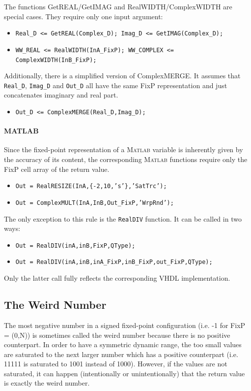 \documentclass[a4paper,11pt]{article}
\begin{document}
The functions GetREAL/GetIMAG and RealWIDTH/ComplexWIDTH are special
cases. They require only one input argument:
\begin{itemize}
\item \texttt{Real\_D <= GetREAL(Complex\_D); Imag\_D <=
    GetIMAG(Complex\_D);}
\item \texttt{WW\_REAL <= RealWIDTH(InA\_FixP); WW\_COMPLEX <=
    ComplexWIDTH(InB\_FixP);}
\end{itemize}
Additionally, there is a simplified version of ComplexMERGE. It
assumes that \texttt{Real\_D}, \texttt{Imag\_D} and \texttt{Out\_D}
all have the same FixP representation and just concatenates imaginary
and real part.
\begin{itemize}
\item \texttt{Out\_D <= ComplexMERGE(Real\_D,Imag\_D);}
\end{itemize}

\paragraph{MATLAB} Since the fixed-point representation of a
\textsc{Matlab} variable is inherently given by the accuracy of its
content, the corresponding \textsc{Matlab} functions require only the
FixP cell array of the return value.
\begin{itemize}
\item \texttt{Out = RealRESIZE(InA,\{-2,10,'s'\},'SatTrc');}
\item \texttt{Out = ComplexMULT(InA,InB,Out\_FixP,'WrpRnd');}
\end{itemize}
The only exception to this rule is the \texttt{RealDIV} function. It
can be called in two ways:
\begin{itemize}
\item \texttt{Out = RealDIV(inA,inB,FixP,QType);}
\item \texttt{Out =
    RealDIV(inA,inB,inA\_FixP,inB\_FixP,out\_FixP,QType);}
\end{itemize}
Only the latter call fully reflects the corresponding VHDL
implementation.

\subsection{The Weird Number} \label{weird_number} The most negative
number in a signed fixed-point configuration (i.e.  -1 for FixP =
(0,N)) is sometimes called the weird number because there is no
positive counterpart. In order to have a symmetric dynamic range, the
too small values are saturated to the next larger number which has a
positive counterpart (i.e. 11111 is saturated to 1001 instead of
1000). However, if the values are not saturated, it can happen
(intentionally or unintentionally) that the return value is exactly
the weird number.
\end{document}
